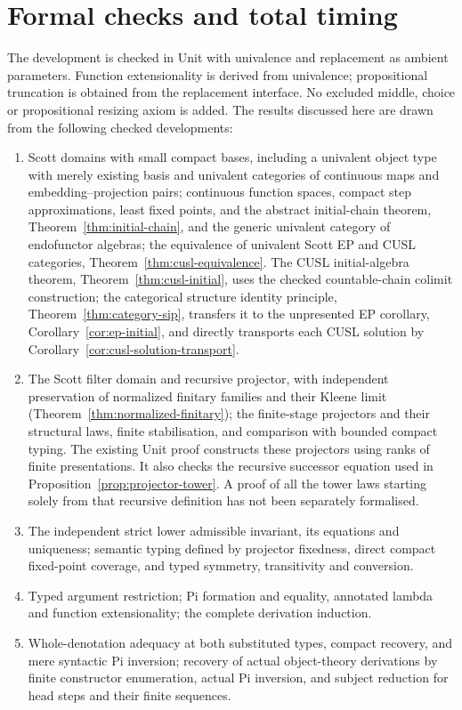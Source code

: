 \documentclass[11pt,a4paper]{article}
\theoremstyle{definition}
\theoremstyle{remark}
\begin{document}
\clearpage
\section*{Formal checks and total timing}\label{sec:formal}

The development is checked in Unit with univalence and replacement as
ambient parameters. Function extensionality is derived from univalence;
propositional truncation is obtained from the replacement interface.
No excluded middle, choice or propositional resizing axiom is added.
The results discussed here are drawn from the following checked developments:
\begin{enumerate}[leftmargin=*,itemsep=3pt]
\item Scott domains with small compact bases, including a univalent object
type with merely existing basis and univalent categories of continuous
maps and embedding--projection pairs; continuous function spaces,
compact step approximations, least fixed points, and the abstract
initial-chain theorem, Theorem~\ref{thm:initial-chain}, and the generic
univalent category of endofunctor algebras; the equivalence of univalent
Scott EP and CUSL categories, Theorem~\ref{thm:cusl-equivalence}.
The CUSL initial-algebra theorem, Theorem~\ref{thm:cusl-initial},
uses the checked countable-chain colimit construction; the categorical
structure identity principle, Theorem~\ref{thm:category-sip}, transfers it to
the unpresented EP corollary, Corollary~\ref{cor:ep-initial}, and directly
transports each CUSL solution by Corollary~\ref{cor:cusl-solution-transport}.
\item The Scott filter domain and recursive projector, with independent
preservation of normalized finitary families and their Kleene limit
(Theorem~\ref{thm:normalized-finitary}); the finite-stage projectors and their structural laws, finite stabilisation, and comparison
with bounded compact typing. The existing Unit proof constructs these
projectors using ranks of finite presentations. It also checks the
recursive successor equation used in
Proposition~\ref{prop:projector-tower}. A proof of all the tower laws
starting solely from that recursive definition has not been separately
formalised.
\item The independent strict lower admissible invariant, its equations
and uniqueness; semantic typing defined by projector fixedness, direct
compact fixed-point coverage, and typed symmetry, transitivity and conversion.
\item Typed argument restriction; Pi formation and equality, annotated
lambda and function extensionality; the complete derivation induction.
\item Whole-denotation adequacy at both substituted types, compact
recovery, and mere syntactic Pi inversion; recovery of actual object-theory
derivations by finite constructor enumeration, actual Pi inversion, and
subject reduction for head steps and their finite sequences.
\end{enumerate}
\end{document}
